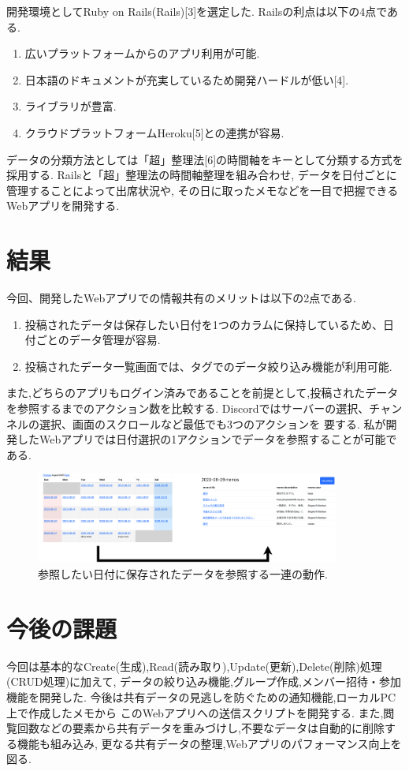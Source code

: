 \documentclass[a4j,twocolumn]{jsarticle}
\begin{document}
開発環境としてRuby on Rails(Rails)[3]を選定した.
Railsの利点は以下の4点である.
\begin{enumerate}
\item 広いプラットフォームからのアプリ利用が可能.
\item 日本語のドキュメントが充実しているため開発ハードルが低い[4].
\item ライブラリが豊富.
\item クラウドプラットフォームHeroku[5]との連携が容易.
\end{enumerate}
データの分類方法としては「超」整理法[6]の時間軸をキーとして分類する方式を採用する.
Railsと「超」整理法の時間軸整理を組み合わせ,
データを日付ごとに管理することによって出席状況や,
その日に取ったメモなどを一目で把握できるWebアプリを開発する.



\section{結果}
\label{sec:org2f19e6f}
今回、開発したWebアプリでの情報共有のメリットは以下の2点である.
\begin{enumerate}
\item 投稿されたデータは保存したい日付を1つのカラムに保持しているため、日付ごとのデータ管理が容易.
\item 投稿されたデータ一覧画面では、タグでのデータ絞り込み機能が利用可能.
\end{enumerate}
また,どちらのアプリもログイン済みであることを前提として,投稿されたデータを参照するまでのアクション数を比較する.
Discordではサーバーの選択、チャンネルの選択、画面のスクロールなど最低でも3つのアクションを
要する.
私が開発したWebアプリでは日付選択の1アクションでデータを参照することが可能である.
\begin{figure}[htbp]
\centering
\includegraphics[width=10cm]{./figs/app_motion.png}
\caption{\label{fig:org18cdb57}参照したい日付に保存されたデータを参照する一連の動作.}
\end{figure}


\section{今後の課題}
\label{sec:org463d252}
今回は基本的なCreate(生成),Read(読み取り),Update(更新),Delete(削除)処理(CRUD処理)に加えて,
データの絞り込み機能,グループ作成,メンバー招待・参加機能を開発した.
今後は共有データの見逃しを防ぐための通知機能,ローカルPC上で作成したメモから
このWebアプリへの送信スクリプトを開発する.
また,閲覧回数などの要素から共有データを重みづけし,不要なデータは自動的に削除する機能も組み込み,
更なる共有データの整理,Webアプリのパフォーマンス向上を図る.
\end{document}
